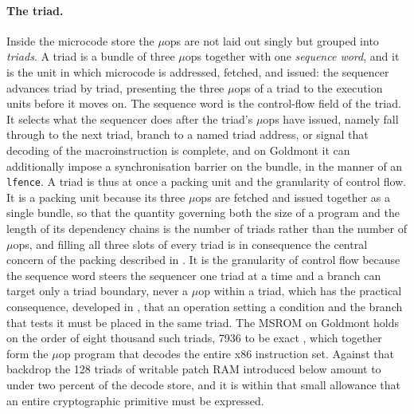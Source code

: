 \paragraph{The triad.}
Inside the microcode store the $\mu$ops are not laid out singly but grouped into
\emph{triads}. A triad is a bundle of three $\mu$ops together with one
\emph{sequence word}, and it is the unit in which microcode is addressed,
fetched, and issued: the sequencer advances triad by triad, presenting the
three $\mu$ops of a triad to the execution units before it moves on. The
sequence word is the control-flow field of the triad. It selects what the
sequencer does after the triad's $\mu$ops have issued, namely fall through to
the next triad, branch to a named triad address, or signal that decoding of the
macroinstruction is complete, and on Goldmont it can additionally impose a
synchronisation barrier on the bundle, in the manner of an \texttt{lfence}.
A triad is thus at once a packing unit and the granularity of control flow. It
is a packing unit because its three $\mu$ops are fetched and issued together as
a single bundle, so that the quantity governing both the size of a program and
the length of its dependency chains is the number of triads rather than the
number of $\mu$ops, and filling all three slots of every triad is in consequence
the central concern of the packing described in . It is
the granularity of control flow because the sequence word steers the sequencer
one triad at a time and a branch can target only a triad boundary, never a
$\mu$op within a triad, which has the practical consequence, developed in
, that an operation setting a condition and the branch that
tests it must be placed in the same triad. The MSROM on Goldmont holds on the
order of eight thousand such triads, 7936 to be exact
\cite{borrelloCustomProcessingUnitReverseEngineering2023}, which together form
the $\mu$op program that decodes the entire x86 instruction set. Against that backdrop the 128
triads of writable patch RAM introduced below amount to under two percent of the
decode store, and it is within that small allowance that an entire cryptographic
primitive must be expressed.

